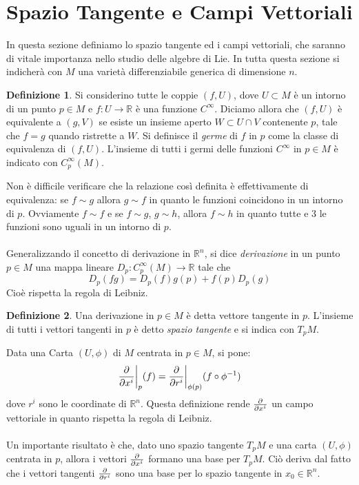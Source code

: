 \documentclass[12pt,a4paper]{report}
\theoremstyle{definition}
\newtheorem{Def}{Definizione}[chapter]
\theoremstyle{definition}
\theoremstyle{definition}
\theoremstyle{definition}
\begin{document}
\section{Spazio Tangente e Campi Vettoriali}
In questa sezione definiamo lo spazio tangente ed i campi vettoriali, che saranno di vitale importanza nello studio delle algebre di Lie. In tutta questa sezione si indicherà con $M$ una varietà differenziabile generica di dimensione $n$. 
\begin{Def}
	Si considerino tutte le coppie $(f,U)$, dove $U\subset M$ è un intorno di un punto $p\in M$ e $f:U\rightarrow \mathbb{R}$ è una funzione $C^\infty$. Diciamo allora che $(f,U)$ è equivalente a $(g,V)$ se esiste un insieme aperto $W\subset U\cap V$ contenente $p$, tale che $f=g$ quando ristrette a $W$. Si definisce il \textit{germe} di $f$ in $p$ come la classe di equivalenza di $(f,U)$.
	L'insieme di tutti i germi delle funzioni $C^\infty$ in $p\in M$ è indicato con $C^\infty_p(M)$.
\end{Def}
Non è difficile verificare che la relazione così definita è effettivamente di equivalenza: se $f\sim g$ allora $g\sim f$ in quanto le funzioni coincidono in un intorno di $p$. Ovviamente $f\sim f$ e se $f\sim g$, $g\sim h$, allora $f\sim h$ in quanto tutte e 3 le funzioni sono uguali in un intorno di $p$.\\
\\
Generalizzando il concetto di derivazione in $\mathbb{R}^n$, si dice \textit{derivazione} in un punto $p\in M$ una mappa lineare $D_p:C^\infty_p(M)\rightarrow\mathbb{R}$ tale che $$D_p(fg)=D_p(f)g(p)+f(p)D_p(g)$$
Cioè rispetta la regola di Leibniz.
\begin{Def}
	Una derivazione in $p\in M$ è detta vettore tangente in $p$. L'insieme di tutti i vettori tangenti in $p$ è detto \textit{spazio tangente} e si indica con $T_pM$.
\end{Def} 
Data una Carta $(U,\phi)$ di $M$ centrata in $p\in M$, si pone:
$${\partial\over \partial x^i}\bigg\rvert_p(f)={\partial\over \partial r^i}\bigg\rvert_{\phi(p)}(f\circ \phi^{-1})$$ dove $r^i$ sono le coordinate di $\mathbb{R}^n$.
Questa definizione rende ${\partial\over \partial x^i}$ un campo vettoriale in quanto rispetta la regola di Leibniz.\\
\\
Un importante risultato è che, dato uno spazio tangente $T_pM$ e una carta $(U,\phi)$ centrata in $p$, allora i vettori $\partial\over \partial x^i$ formano una base per $T_pM$. Ciò deriva dal fatto che i vettori tangenti $\partial\over \partial r^i$ sono una base per lo spazio tangente in $x_0\in\mathbb{R}^n$.\\
\end{document}
